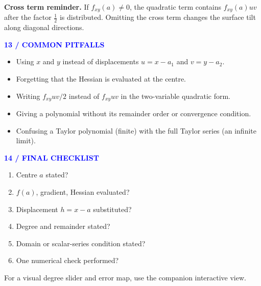 \documentclass[10.5pt]{article}
\newcommand{\tagline}[1]{\par\medskip\textcolor{blue}{\sffamily\footnotesize\bfseries #1}\par\vspace{1pt}}
\begin{document}
\begin{graybox}
\textbf{Cross term reminder.} If $f_{xy}(a)\ne0$, the quadratic term contains $f_{xy}(a)uv$ after the factor $\tfrac12$ is distributed. Omitting the cross term changes the surface tilt along diagonal directions.
\end{graybox}
\tagline{13 / COMMON PITFALLS}
\begin{itemize}[leftmargin=*,itemsep=2pt,topsep=2pt]
\item Using $x$ and $y$ instead of displacements $u=x-a_1$ and $v=y-a_2$.
\item Forgetting that the Hessian is evaluated at the centre.
\item Writing $f_{xy}uv/2$ instead of $f_{xy}uv$ in the two-variable quadratic form.
\item Giving a polynomial without its remainder order or convergence condition.
\item Confusing a Taylor polynomial (finite) with the full Taylor series (an infinite limit).
\end{itemize}
\tagline{14 / FINAL CHECKLIST}
\begin{bluebox}
\begin{enumerate}[leftmargin=*,itemsep=1pt,topsep=1pt]
\item Centre $a$ stated?\quad \checkmark
\item $f(a)$, gradient, Hessian evaluated?\quad \checkmark
\item Displacement $h=x-a$ substituted?\quad \checkmark
\item Degree and remainder stated?\quad \checkmark
\item Domain or scalar-series condition stated?\quad \checkmark
\item One numerical check performed?\quad \checkmark
\end{enumerate}
\end{bluebox}
\vfill
\begin{center}\sffamily\footnotesize For a visual degree slider and error map, use the companion interactive view.\end{center}
\end{document}
